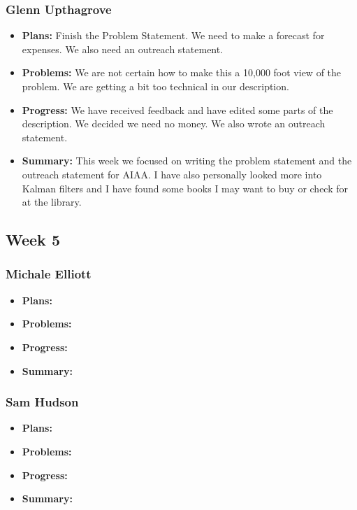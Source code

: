 \documentclass[onecolumn, draftclsnofoot,10pt, compsoc]{IEEEtran}
\begin{document}
\subsubsection{Glenn Upthagrove}
\begin {itemize}
 \item \textbf{Plans: }Finish the Problem Statement. We need to make a forecast for expenses. We also need an outreach statement. 
 \item \textbf{Problems: }We are not certain how to make this a 10,000 foot view of the problem. We are getting a bit too technical in our description. 
 \item \textbf{Progress: }We have received feedback and have edited some parts of the description. We decided we need no money. We also wrote an outreach statement. 
 \item \textbf{Summary: }This week we focused on writing the problem statement and the outreach statement for AIAA. I have also personally looked more into Kalman filters and I have found some books I may want to buy or check for at the library.  
\end {itemize}
\subsection {Week 5}
\subsubsection{Michale Elliott}
\begin {itemize}
 \item \textbf{Plans: }
 \item \textbf{Problems: }
 \item \textbf{Progress: }
 \item \textbf{Summary: }
\end {itemize}
\subsubsection{Sam Hudson}
\begin {itemize}
 \item \textbf{Plans: }
 \item \textbf{Problems: }
 \item \textbf{Progress: }
 \item \textbf{Summary: }
\end {itemize}
\end{document}
